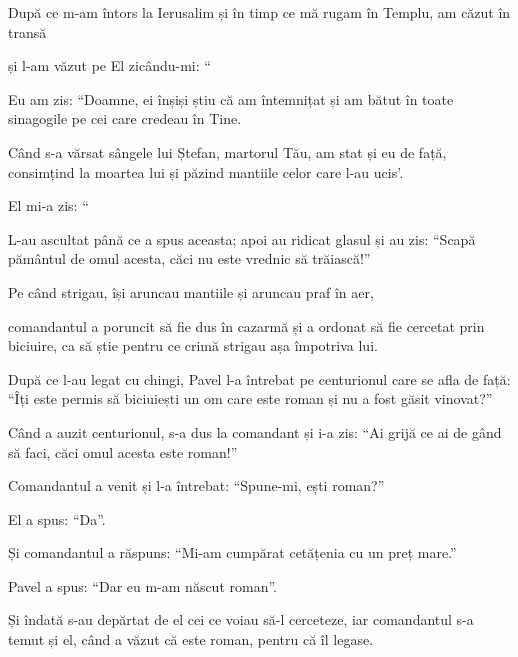 {\par }{\PP {}După ce m-am întors la Ierusalim și în timp ce mă rugam în Templu, am căzut în transă

și l-am văzut pe El zicându-mi: “{}

Eu am zis: “Doamne, ei înșiși știu că am întemnițat și am bătut în toate sinagogile pe cei care credeau în Tine.

Când s-a vărsat sângele lui Ștefan, martorul Tău, am stat și eu de față, consimțind la moartea lui și păzind mantiile celor care l-au ucis'.


\par }{\PP {}El mi-a zis: “{}


\par }{\PP {}L-au ascultat până ce a spus aceasta; apoi au ridicat glasul și au zis: “Scapă pământul de omul acesta, căci nu este vrednic să trăiască!”


\par }{\PP {}Pe când strigau, își aruncau mantiile și aruncau praf în aer,

comandantul a poruncit să fie dus în cazarmă și a ordonat să fie cercetat prin biciuire, ca să știe pentru ce crimă strigau așa împotriva lui.

După ce l-au legat cu chingi, Pavel l-a întrebat pe centurionul care se afla de față: “Îți este permis să biciuiești un om care este roman și nu a fost găsit vinovat?”


\par }{\PP {}Când a auzit centurionul, s-a dus la comandant și i-a zis: “Ai grijă ce ai de gând să faci, căci omul acesta este roman!”


\par }{\PP {}Comandantul a venit și l-a întrebat: “Spune-mi, ești roman?”

\par }{\PP El a spus: “Da”.


\par }{\PP {}Și comandantul a răspuns: “Mi-am cumpărat cetățenia cu un preț mare.”

\par }{\PP Pavel a spus: “Dar eu m-am născut roman”.


\par }{\PP {}Și îndată s-au depărtat de el cei ce voiau să-l cerceteze, iar comandantul s-a temut și el, când a văzut că este roman, pentru că îl legase.

}
